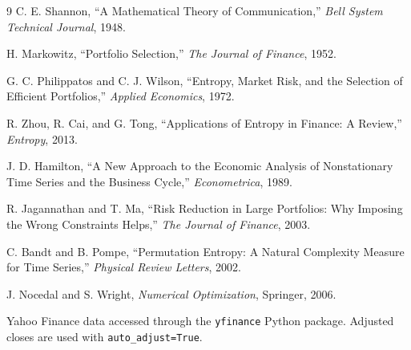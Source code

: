 \documentclass[a4paper,12pt]{article}
\begin{document}
\begin{thebibliography}{9}
C. E. Shannon, ``A Mathematical Theory of Communication,'' \textit{Bell System Technical Journal}, 1948.

H. Markowitz, ``Portfolio Selection,'' \textit{The Journal of Finance}, 1952.

G. C. Philippatos and C. J. Wilson, ``Entropy, Market Risk, and the Selection of Efficient Portfolios,'' \textit{Applied Economics}, 1972.

R. Zhou, R. Cai, and G. Tong, ``Applications of Entropy in Finance: A Review,'' \textit{Entropy}, 2013.

J. D. Hamilton, ``A New Approach to the Economic Analysis of Nonstationary Time Series and the Business Cycle,'' \textit{Econometrica}, 1989.

R. Jagannathan and T. Ma, ``Risk Reduction in Large Portfolios: Why Imposing the Wrong Constraints Helps,'' \textit{The Journal of Finance}, 2003.

C. Bandt and B. Pompe, ``Permutation Entropy: A Natural Complexity Measure for Time Series,'' \textit{Physical Review Letters}, 2002.

J. Nocedal and S. Wright, \textit{Numerical Optimization}, Springer, 2006.

Yahoo Finance data accessed through the \texttt{yfinance} Python package. Adjusted closes are used with \texttt{auto\_adjust=True}.
\end{thebibliography}
\end{document}
